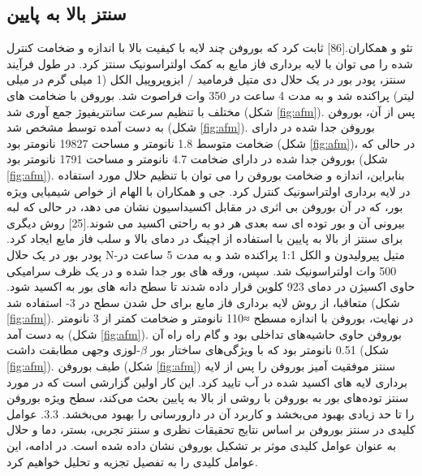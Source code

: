 \subsection{سنتز بالا به پایین}
تئو و همکاران.\cite{liScalableProductionFewLayer2018}[86] ثابت کرد که بوروفن چند لایه با کیفیت بالا با اندازه و ضخامت کنترل شده را می توان با لایه برداری فاز مایع به کمک اولتراسونیک سنتز کرد. در طول فرآیند سنتز، پودر بور در یک حلال دی متیل فرمامید  / ایزوپروپیل الکل  (1 میلی گرم در میلی لیتر) پراکنده شد و به مدت 4 ساعت در 350 وات فراصوت شد. بوروفن با ضخامت های مختلف با تنظیم سرعت سانتریفیوژ جمع آوری شد (شکل \ref{fig:afm}). پس از آن، بوروفن به دست آمده توسط  مشخص شد (شکل \ref{fig:afm}). بوروفن جدا شده در  دارای ضخامت متوسط 1.8 نانومتر و مساحت 19827 نانومتر بود (شکل \ref{fig:afm})، در حالی که بوروفن جدا شده در  دارای ضخامت 4.7 نانومتر و مساحت 1791 نانومتر بود (شکل \ref{fig:afm}). بنابراین، اندازه و ضخامت بوروفن را می توان با تنظیم حلال مورد استفاده در لایه برداری اولتراسونیک کنترل کرد. جی و همکاران با الهام از خواص شیمیایی ویژه بور، که در آن بوروفن بی اثری در مقابل اکسیداسیون نشان می دهد، در حالی که لبه بیرونی آن و بور توده ای سه بعدی هر دو به راحتی اکسید می شوند.\cite{jiNovelTopDownSynthesis2018}[25] روش دیگری برای سنتز از بالا به پایین با استفاده از اچینگ در دمای بالا و سلب فاز مایع ایجاد کرد. پودر بور در یک حلال N-متیل پیرولیدون  و الکل 1:1 پراکنده شد و به مدت 5 ساعت در 500 وات اولتراسونیک شد. سپس، ورقه های بور جدا شده و در یک ظرف سرامیکی حاوی اکسیژن در دمای 923 کلوین قرار داده شدند تا سطح دانه های بور به  اکسید شود. متعاقبا، از روش لایه برداری فاز مایع برای حل شدن سطح  در  3- استفاده شد (شکل \ref{fig:afm}). در نهایت، بوروفن با اندازه مسطح ≈110 نانومتر و ضخامت کمتر از 3 نانومتر به دست آمد (شکل \ref{fig:afm}). بوروفن حاوی حاشیه‌های تداخلی بود و گام راه راه آن 0.51 نانومتر بود که با ویژگی‌های ساختار بور $\beta$-لوزی وجهی مطابقت داشت (شکل \ref{fig:afm}). طیف  بوروفن (شکل \ref{fig:afm}) سنتز موفقیت آمیز بوروفن را پس از لایه برداری لایه های اکسید شده در آب تایید کرد. این کار اولین گزارشی است که در مورد سنتز توده‌های بور به بوروفن با روشی از بالا به پایین بحث می‌کند، سطح ویژه بوروفن را تا حد زیادی بهبود می‌بخشد و کاربرد آن در دارورسانی را بهبود می‌بخشد. 3.3. عوامل کلیدی در سنتز بوروفن بر اساس نتایج تحقیقات نظری و سنتز تجربی، بستر، دما و حلال به عنوان عوامل کلیدی موثر بر تشکیل بوروفن نشان داده شده است. در ادامه، این عوامل کلیدی را به تفصیل تجزیه و تحلیل خواهیم کرد.

